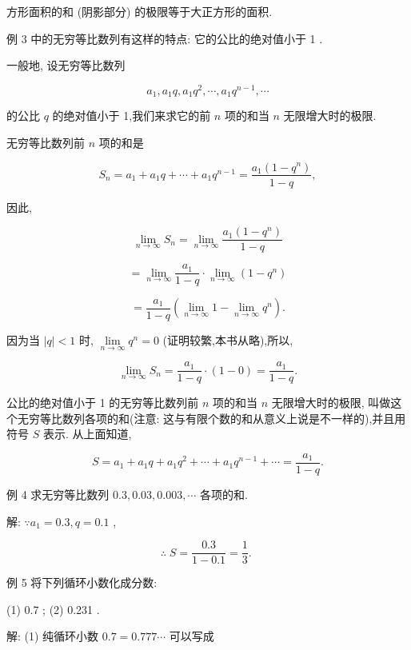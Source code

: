 \documentclass[10pt]{article}
\begin{document}
方形面积的和 (阴影部分) 的极限等于大正方形的面积.

例 3 中的无穷等比数列有这样的特点: 它的公比的绝对值小于 1 .

一般地, 设无穷等比数列

\[
{a}_{1},{a}_{1}q,{a}_{1}{q}^{2},\cdots ,{a}_{1}{q}^{n - 1},\cdots
\]

的公比 \(q\) 的绝对值小于 1,我们来求它的前 \(n\) 项的和当 \(n\) 无限增大时的极限.

无穷等比数列前 \(n\) 项的和是

\[
{S}_{n} = {a}_{1} + {a}_{1}q + \cdots + {a}_{1}{q}^{n - 1} = \frac{{a}_{1}\left( {1 - {q}^{n}}\right) }{1 - q},
\]

因此,

\[
\mathop{\lim }\limits_{{n \rightarrow \infty }}{S}_{n} = \mathop{\lim }\limits_{{n \rightarrow \infty }}\frac{{a}_{1}\left( {1 - {q}^{n}}\right) }{1 - q}
\]

\[
= \mathop{\lim }\limits_{{n \rightarrow \infty }}\frac{{a}_{1}}{1 - q} \cdot \mathop{\lim }\limits_{{n \rightarrow \infty }}\left( {1 - {q}^{n}}\right)
\]

\[
= \frac{{a}_{1}}{1 - q}\left( {\mathop{\lim }\limits_{{n \rightarrow \infty }}1 - \mathop{\lim }\limits_{{n \rightarrow \infty }}{q}^{n}}\right) .
\]

因为当 \(\left| q\right| < 1\) 时, \(\mathop{\lim }\limits_{{n \rightarrow \infty }}{q}^{n} = 0\) (证明较繁,本书从略),所以,

\[
\mathop{\lim }\limits_{{n \rightarrow \infty }}{S}_{n} = \frac{{a}_{1}}{1 - q} \cdot \left( {1 - 0}\right) = \frac{{a}_{1}}{1 - q}.
\]

公比的绝对值小于 1 的无穷等比数列前 \(n\) 项的和当 \(n\) 无限增大时的极限, 叫做这个无穷等比数列各项的和(注意: 这与有限个数的和从意义上说是不一样的),并且用符号 \(S\) 表示. 从上面知道,

\[
S = {a}_{1} + {a}_{1}q + {a}_{1}{q}^{2} + \cdots + {a}_{1}{q}^{n - 1} + \cdots = \frac{{a}_{1}}{1 - q}.
\]

例 4 求无穷等比数列 \({0.3},{0.03},{0.003},\cdots\) 各项的和.

解: \(\because {a}_{1} = {0.3},q = {0.1}\) ,

\[
\therefore \;S = \frac{0.3}{1 - {0.1}} = \frac{1}{3}\text{. }
\]

例 5 将下列循环小数化成分数:

(1) 0.7 ; (2) 0.231 .

解: (1) 纯循环小数 \({0.7} = {0.777}\cdots\) 可以写成
\end{document}
